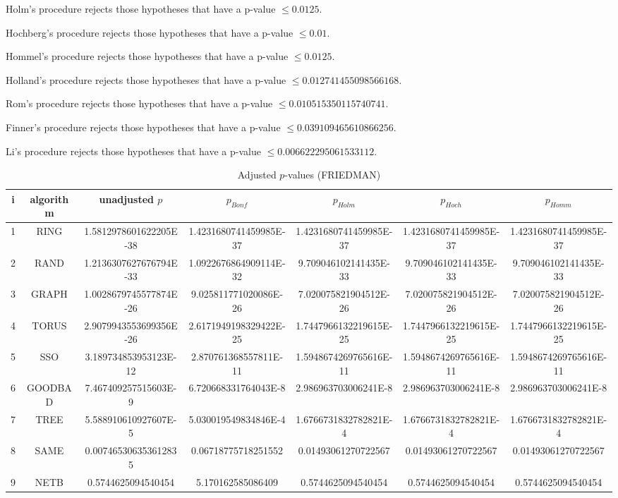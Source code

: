 \documentclass[a4paper,10pt]{article}
\begin{document}
\begin{landscape}
Holm's procedure rejects those hypotheses that have a p-value $\le0.0125$.


Hochberg's procedure rejects those hypotheses that have a p-value $\le0.01$.


Hommel's procedure rejects those hypotheses that have a p-value $\le0.0125$.


Holland's procedure rejects those hypotheses that have a p-value $\le0.012741455098566168$.


Rom's procedure rejects those hypotheses that have a p-value $\le0.010515350115740741$.


Finner's procedure rejects those hypotheses that have a p-value $\le0.039109465610866256$.


Li's procedure rejects those hypotheses that have a p-value $\le0.006622295061533112$.



\newpage

\begin{table}[!htp]
\centering\scriptsize
\caption{Adjusted $p$-values (FRIEDMAN)}
\begin{tabular}{ccccccc}
i&algorithm&unadjusted $p$&$p_{Bonf}$&$p_{Holm}$&$p_{Hoch}$&$p_{Homm}$\\
\hline
1& RING&1.5812978601622205E-38&1.4231680741459985E-37&1.4231680741459985E-37&1.4231680741459985E-37&1.4231680741459985E-37\\
2& RAND&1.2136307627676794E-33&1.0922676864909114E-32&9.709046102141435E-33&9.709046102141435E-33&9.709046102141435E-33\\
3& GRAPH&1.0028679745577874E-26&9.025811771020086E-26&7.020075821904512E-26&7.020075821904512E-26&7.020075821904512E-26\\
4& TORUS&2.9079943553699356E-26&2.6171949198329422E-25&1.7447966132219615E-25&1.7447966132219615E-25&1.7447966132219615E-25\\
5& SSO&3.189734853953123E-12&2.870761368557811E-11&1.5948674269765616E-11&1.5948674269765616E-11&1.5948674269765616E-11\\
6& GOODBAD&7.467409257515603E-9&6.720668331764043E-8&2.986963703006241E-8&2.986963703006241E-8&2.986963703006241E-8\\
7& TREE&5.588910610927607E-5&5.030019549834846E-4&1.6766731832782821E-4&1.6766731832782821E-4&1.6766731832782821E-4\\
8& SAME&0.007465306353612835&0.06718775718251552&0.01493061270722567&0.01493061270722567&0.01493061270722567\\
9& NETB&0.5744625094540454&5.170162585086409&0.5744625094540454&0.5744625094540454&0.5744625094540454\\
\hline
\end{tabular}
\end{table}


\end{landscape}
\end{document}
